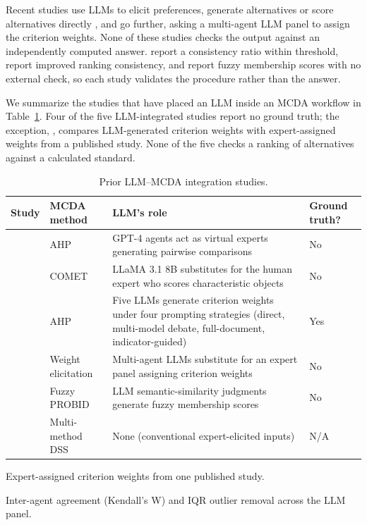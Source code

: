 \documentclass[final,3p,times]{elsarticle}
\begin{document}
Recent studies use LLMs to elicit preferences, generate alternatives or score alternatives directly \cite{svoboda2024,icaart26}, and \citet{vahidnia2025walmas} go further, asking a multi-agent LLM panel to assign the criterion weights. None of these studies checks the output against an independently computed answer. \citet{svoboda2024} report a consistency ratio within threshold, \citet{icaart26} report improved ranking consistency, and \citet{anhao2025probid} report fuzzy membership scores with no external check, so each study validates the procedure rather than the answer.

We summarize the studies that have placed an LLM inside an MCDA workflow in Table~\ref{tab:llm-mcda-prior-work}. Four of the five LLM-integrated studies report no ground truth; the exception, \citet{cheng2026wildfire}, compares LLM-generated criterion weights with expert-assigned weights from a published study. None of the five checks a ranking of alternatives against a calculated standard.

\begin{table}[htbp]
\caption{Prior LLM--MCDA integration studies.}
\label{tab:llm-mcda-prior-work}
\centering
\begin{threeparttable}
\centering
\footnotesize
\begin{tabular}{@{}>{\raggedright\arraybackslash}p{}>{\raggedright\arraybackslash}p{}>{\raggedright\arraybackslash}p{}p{}@{}}
\toprule
\textbf{Study} & \textbf{MCDA method} & \textbf{LLM's role} & \textbf{Ground truth?} \\
\midrule
\citet{svoboda2024} & AHP & GPT-4 agents act as virtual experts generating pairwise comparisons & No \\
\citet{icaart26} & COMET & LLaMA 3.1 8B substitutes for the human expert who scores characteristic objects & No \\
\citet{cheng2026wildfire} & AHP & Five LLMs generate criterion weights under four prompting strategies (direct, multi-model debate, full-document, indicator-guided) & Yes\tnote{a} \\
\citet{vahidnia2025walmas} & Weight elicitation & Multi-agent LLMs substitute for an expert panel assigning criterion weights & No\tnote{b} \\
\citet{anhao2025probid} & Fuzzy PROBID & LLM semantic-similarity judgments generate fuzzy membership scores & No \\
\citet{huangburgherr2024} & Multi-method DSS & None (conventional expert-elicited inputs) & N/A \\
\bottomrule
\end{tabular}
\begin{tablenotes}
\item[a] Expert-assigned criterion weights from one published study.
\item[b] Inter-agent agreement (Kendall's W) and IQR outlier removal across the LLM panel.
\end{tablenotes}
\end{threeparttable}
\end{table}
\end{document}
